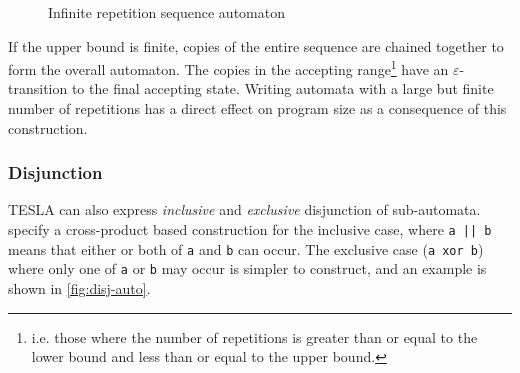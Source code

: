 \begin{figure}
  \centering
  \caption{Infinite repetition sequence automaton}
  \label{fig:seq-inf-auto}
\end{figure}

If the upper bound is finite, copies of the entire sequence are chained together
to form the overall automaton. The copies in the accepting range\footnote{i.e.
those where the number of repetitions is greater than or equal to the lower
bound and less than or equal to the upper bound.} have an
$\varepsilon$-transition to the final accepting state. Writing automata with a
large but finite number of repetitions has a direct effect on program size as a
consequence of this construction.

\subsubsection{Disjunction}

TESLA can also express \emph{inclusive} and \emph{exclusive} disjunction of
sub-automata. \textcite{anderson_tesla:_2014} specify a cross-product based
construction for the inclusive case, where \texttt{a || b} means that either or
both of \texttt{a} and \texttt{b} can occur. The exclusive case (\texttt{a xor
b}) where only one of \texttt{a} or \texttt{b} may occur is simpler to
construct, and an example is shown in \autoref{fig:disj-auto}.

